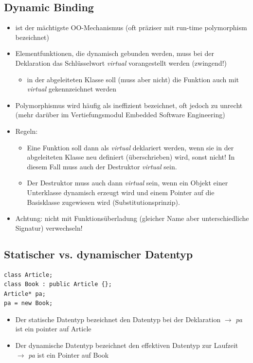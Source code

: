 \subsection{Dynamic Binding}
\label{sec:Dynamic Binding}
\begin{itemize}
	\item ist der mächtigste OO-Mechanismus (oft präziser mit run-time polymorphism bezeichnet)
	\item Elementfunktionen, die dynamisch gebunden werden, muss bei der Deklaration das Schlüsselwort \emph{virtual} vorangestellt werden (zwingend!)
	\begin{itemize}
		\item in der abgeleiteten Klasse soll (muss aber nicht) die Funktion auch mit \emph{virtual} gekennzeichnet werden
	\end{itemize}
	\item Polymorphismus wird häufig als ineffizient bezeichnet, oft jedoch zu unrecht (mehr darüber im Vertiefungsmodul Embedded Software Engineering)
	\item Regeln:
	\begin{itemize}
		\item Eine Funktion soll dann als \emph{virtual} deklariert werden, wenn sie in der abgeleiteten Klasse neu definiert (überschrieben) wird, sonst nicht! In diesem Fall muss auch der Destruktor \emph{virtual} sein.
		\item Der Destruktor muss auch dann \emph{virtual} sein, wenn ein Objekt einer Unterklasse dynamisch erzeugt wird und einem Pointer auf die Basisklasse zugewiesen wird (Substitutionsprinzip).
	\end{itemize}
	\item Achtung: nicht mit Funktionsüberladung (gleicher Name aber unterschiedliche Signatur) verwechseln!
\end{itemize}

\subsection{Statischer vs. dynamischer Datentyp}
\vspace{-\baselineskip}
\begin{minipage}{0.4\linewidth}
\begin{lstlisting}
class Article;
class Book : public Article {};
Article* pa;
pa = new Book;
\end{lstlisting}
\end{minipage}
\begin{itemize}
	\item Der statische Datentyp bezeichnet den Datentyp bei der Deklaration $\rightarrow$ \emph{pa} ist ein pointer auf Article
	\item Der dynamische Datentyp bezeichnet den effektiven Datentyp zur Laufzeit $\rightarrow$ \emph{pa} ist ein Pointer auf Book
\end{itemize}

